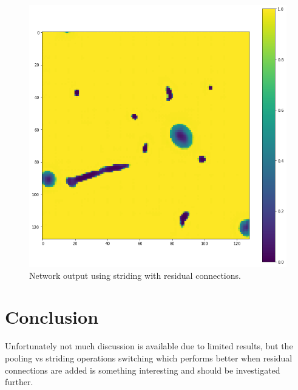 \documentclass[10pt,twocolumn,letterpaper]{article}
\begin{document}
\begin{figure}[!h]
    \begin{center}
       \includegraphics[width=0.95\linewidth]{figures/output-striding-residual.png}
    \end{center}
       \caption{Network output using striding with residual connections.}
    \label{fig:output striding}
\end{figure}


\section{Conclusion}

Unfortunately not much discussion is available due to limited results, but the pooling vs striding operations switching which performs better when residual connections are added is something interesting and should be investigated further.


{\small


}
\end{document}
